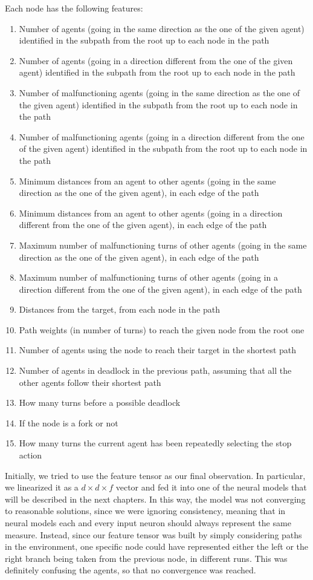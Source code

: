 \documentclass[a4paper,10pt]{report}
\begin{document}
Each node has the following features:
\begin{enumerate}
	\item Number of agents (going in the same direction as the one of the given agent) identified in the subpath from the root up to each node in the path
	\item Number of agents (going in a direction different from the one of the given agent) identified in the subpath from the root up to each node in the path
 	\item Number of malfunctioning agents (going in the same direction as the one of the given agent) identified in the subpath from the root up to each node in the path
	\item Number of malfunctioning agents (going in a direction different from the one of the given agent) identified in the subpath from the root up to each node in the path
	\item Minimum distances from an agent to other agents (going in the same direction as the one of the given agent), in each edge of the path
	\item Minimum distances from an agent to other agents (going in a direction different from the one of the given agent), in each edge of the path
	\item Maximum number of malfunctioning turns of other agents (going in the same direction as the one of the given agent), in each edge of the path
	\item Maximum number of malfunctioning turns of other agents (going in a direction different from the one of the given agent), in each edge of the path
 	\item Distances from the target, from each node in the path
 	\item Path weights (in number of turns) to reach the given node from the root one
 	\item Number of agents using the node to reach their target in the shortest path
 	\item Number of agents in deadlock in the previous path, assuming that all the other agents follow their shortest path
 	\item How many turns before a possible deadlock
 	\item If the node is a fork or not
 	\item How many turns the current agent has been repeatedly selecting the stop action
\end{enumerate}

Initially, we tried to use the feature tensor as our final observation. In particular, we linearized it as a $d\times d \times f$ vector and fed it into one of the neural models that will be described in the next chapters. In this way, the model was not converging to reasonable solutions, since we were ignoring consistency, meaning that in neural models each and every input neuron should always represent the same measure. Instead, since our feature tensor was built by simply considering paths in the environment, one specific node could have represented either the left or the right branch being taken from the previous node, in different runs. This was definitely confusing the agents, so that no convergence was reached.
\end{document}
